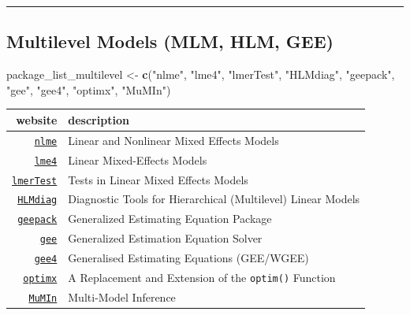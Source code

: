 \documentclass[]{book}
\newenvironment{Shaded}{\begin{snugshade}}{\end{snugshade}}
\newcommand{\KeywordTok}[1]{\textcolor[rgb]{0.13,0.29,0.53}{\textbf{#1}}}
\newcommand{\StringTok}[1]{\textcolor[rgb]{0.31,0.60,0.02}{#1}}
\newcommand{\NormalTok}[1]{#1}
\theoremstyle{definition}
\theoremstyle{definition}
\theoremstyle{definition}
\theoremstyle{remark}
\begin{document}
\begin{center}\rule{0.5\linewidth}{\linethickness}\end{center}

\subsection{Multilevel Models (MLM, HLM,
GEE)}\label{multilevel-models-mlm-hlm-gee}

\begin{Shaded}
\begin{Highlighting}[]
\NormalTok{package_list_multilevel <-}\StringTok{ }\KeywordTok{c}\NormalTok{(}\StringTok{"nlme"}\NormalTok{,}
                             \StringTok{"lme4"}\NormalTok{,}
                             \StringTok{"lmerTest"}\NormalTok{,}
                             \StringTok{"HLMdiag"}\NormalTok{,}
                             \StringTok{"geepack"}\NormalTok{,}
                             \StringTok{"gee"}\NormalTok{,}
                             \StringTok{"gee4"}\NormalTok{,}
                             \StringTok{"optimx"}\NormalTok{,}
                             \StringTok{"MuMIn"}\NormalTok{)}
\end{Highlighting}
\end{Shaded}

\begin{longtable}[]{@{}rl@{}}
\toprule
website & description\tabularnewline
\midrule
\endhead
\href{http://davidakenny.net/papers/k\&h/MLM_R.pdf}{\texttt{nlme}} &
Linear and Nonlinear Mixed Effects Models\tabularnewline
\href{https://github.com/lme4/lme4/}{\texttt{lme4}} & Linear
Mixed-Effects Models\tabularnewline
\href{https://github.com/runehaubo/lmerTestR}{\texttt{lmerTest}} & Tests
in Linear Mixed Effects Models\tabularnewline
\href{https://github.com/aloy/HLMdiag}{\texttt{HLMdiag}} & Diagnostic
Tools for Hierarchical (Multilevel) Linear Models\tabularnewline
\href{https://cran.r-project.org/web/packages/geepack/vignettes/geepack-manual.pdf}{\texttt{geepack}}
& Generalized Estimating Equation Package\tabularnewline
\href{https://cran.r-project.org/web/packages/gee/gee.pdf}{\texttt{gee}}
& Generalized Estimation Equation Solver\tabularnewline
\href{https://github.com/ypan1988/gee4}{\texttt{gee4}} & Generalised
Estimating Equations (GEE/WGEE)\tabularnewline
\href{file:///C:/Users/A00315273/Downloads/v43i09.pdf}{\texttt{optimx}}
& A Replacement and Extension of the \texttt{optim()}
Function\tabularnewline
\href{https://sites.google.com/site/rforfishandwildlifegrads/home/mumin_usage_examples}{\texttt{MuMIn}}
& Multi-Model Inference\tabularnewline
\bottomrule
\end{longtable}
\end{document}
